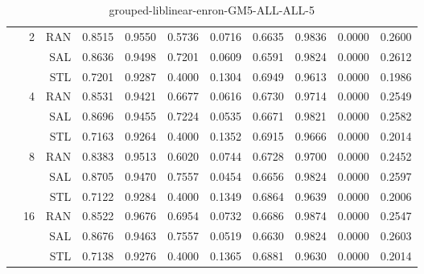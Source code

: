 \begin{center}
\begin{table}[htbp]
\begin{center}
\begin{tabular}{ | r | r | r | r | r | r | r | r | r | r | r |}
 & \multirow{3}{*}{2} & RAN & 0.8515 & 0.9550 & 0.5736 & 0.0716 & 0.6635 & 0.9836 & 0.0000 & 0.2600\\ \cline{3-11}
 &   & SAL & 0.8636 & 0.9498 & 0.7201 & 0.0609 & 0.6591 & 0.9824 & 0.0000 & 0.2612\\ \cline{3-11}
 &   & STL & 0.7201 & 0.9287 & 0.4000 & 0.1304 & 0.6949 & 0.9613 & 0.0000 & 0.1986\\ \cline{2-11}
 & \multirow{3}{*}{4} & RAN & 0.8531 & 0.9421 & 0.6677 & 0.0616 & 0.6730 & 0.9714 & 0.0000 & 0.2549\\ \cline{3-11}
 &   & SAL & 0.8696 & 0.9455 & 0.7224 & 0.0535 & 0.6671 & 0.9821 & 0.0000 & 0.2582\\ \cline{3-11}
 &   & STL & 0.7163 & 0.9264 & 0.4000 & 0.1352 & 0.6915 & 0.9666 & 0.0000 & 0.2014\\ \cline{2-11}
 & \multirow{3}{*}{8} & RAN & 0.8383 & 0.9513 & 0.6020 & 0.0744 & 0.6728 & 0.9700 & 0.0000 & 0.2452\\ \cline{3-11}
 &   & SAL & 0.8705 & 0.9470 & 0.7557 & 0.0454 & 0.6656 & 0.9824 & 0.0000 & 0.2597\\ \cline{3-11}
 &   & STL & 0.7122 & 0.9284 & 0.4000 & 0.1349 & 0.6864 & 0.9639 & 0.0000 & 0.2006\\ \cline{2-11}
 & \multirow{3}{*}{16} & RAN & 0.8522 & 0.9676 & 0.6954 & 0.0732 & 0.6686 & 0.9874 & 0.0000 & 0.2547\\ \cline{3-11}
 &   & SAL & 0.8676 & 0.9463 & 0.7557 & 0.0519 & 0.6630 & 0.9824 & 0.0000 & 0.2603\\ \cline{3-11}
 &   & STL & 0.7138 & 0.9276 & 0.4000 & 0.1365 & 0.6881 & 0.9630 & 0.0000 & 0.2014\\ \cline{2-11}
\hline
\end{tabular}
\caption{grouped-liblinear-enron-GM5-ALL-ALL-5}
\end{center}
 \end{table}
\end{center}

